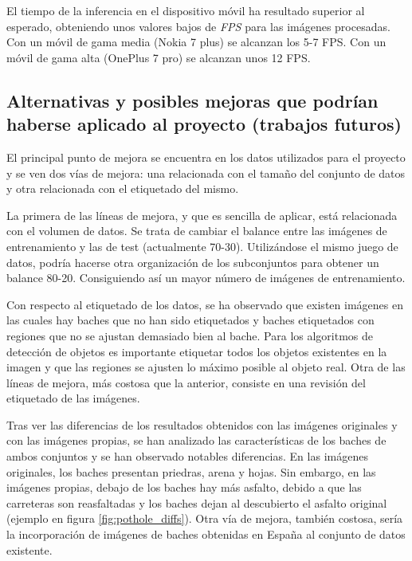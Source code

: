 El tiempo de la inferencia en el dispositivo móvil ha resultado superior al esperado, obteniendo unos valores bajos de \textit{FPS} para las imágenes procesadas. Con un móvil de gama media (Nokia 7 plus) se alcanzan los 5-7 FPS. Con un móvil de gama alta (OnePlus 7 pro) se alcanzan unos 12 FPS.

\subsection{Alternativas y posibles mejoras que podrían haberse aplicado al proyecto (trabajos futuros)}

El principal punto de mejora se encuentra en los datos utilizados para el proyecto y se ven dos vías de mejora: una relacionada con el tamaño del conjunto de datos y otra relacionada con el etiquetado del mismo.

La primera de las líneas de mejora, y que es sencilla de aplicar, está relacionada con el volumen de datos. Se trata de cambiar el balance entre las imágenes de entrenamiento y las de test (actualmente 70-30). Utilizándose el mismo juego de datos, podría hacerse otra organización de los subconjuntos para obtener un balance 80-20. Consiguiendo así un mayor número de imágenes de entrenamiento.

Con respecto al etiquetado de los datos, se ha observado que existen imágenes en las cuales hay baches que no han sido etiquetados y baches etiquetados con regiones que no se ajustan demasiado bien al bache. Para los algoritmos de detección de objetos es importante etiquetar todos los objetos existentes en la imagen y que las regiones se ajusten lo máximo posible al objeto real. Otra de las líneas de mejora, más costosa que la anterior, consiste en una revisión del etiquetado de las imágenes.

Tras ver las diferencias de los resultados obtenidos con las imágenes originales y con las imágenes propias, se han analizado las características de los baches de ambos conjuntos y se han observado notables diferencias. En las imágenes originales, los baches presentan priedras, arena y hojas. Sin embargo, en las imágenes propias, debajo de los baches hay más asfalto, debido a que las carreteras son reasfaltadas y los baches dejan al descubierto el asfalto original (ejemplo en figura \ref{fig:pothole_diffs}). Otra vía de mejora, también costosa, sería la incorporación de imágenes de baches obtenidas en España al conjunto de datos existente.

